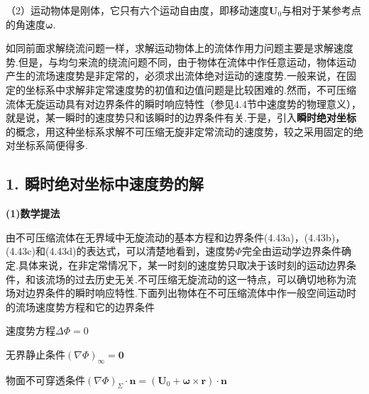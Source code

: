（2）运动物体是刚体，它只有六个运动自由度，即移动速度$\boldsymbol{U}_0$与相对于某参考点的角速度$\boldsymbol{\omega}$.

如同前面求解绕流问题一样，求解运动物体上的流体作用力问题主要是求解速度势.但是，与均匀来流的绕流问题不同，由于物体在流体中作任意运动，物体运动产生的流场速度势是非定常的，必须求出流体绝对运动的速度势.一般来说，在固定的坐标系中求解非定常速度势的初值和边值问题是比较困难的.然而，不可压缩流体无旋运动具有对边界条件的瞬时响应特性（参见4.4节中速度势的物理意义），就是说，某一瞬时的速度势只和该瞬时的边界条件有关.于是，引入\textbf{瞬时绝对坐标}的概念，用这种坐标系求解不可压缩无旋非定常流动的速度势，较之采用固定的绝对坐标系简便得多.

\subsection*{1. 瞬时绝对坐标中速度势的解}

\textbf{(1)数学提法}

由不可压缩流体在无界域中无旋流动的基本方程和边界条件(4.43a)，(4.43b)，(4.43c)和(4.43d)的表达式，可以清楚地看到，速度势$\Phi$完全由运动学边界条件确定.具体来说，在非定常情况下，某一时刻的速度势只取决于该时刻的运动边界条件，和该流场的过去历史无关.不可压缩无旋流动的这一特点，可以确切地称为流场对边界条件的瞬时响应特性.下面列出物体在不可压缩流体中作一般空间运动时的流场速度势方程和它的边界条件

速度势方程\qquad $\Delta\Phi=0$

无界静止条件\qquad $(\nabla\Phi)_\infty=\boldsymbol{0}$

物面不可穿透条件\qquad $(\nabla\Phi)_\Sigma\cdot\boldsymbol{n}=(\boldsymbol{U}_0+\boldsymbol{\omega}\times\boldsymbol{r})\cdot\boldsymbol{n}$

